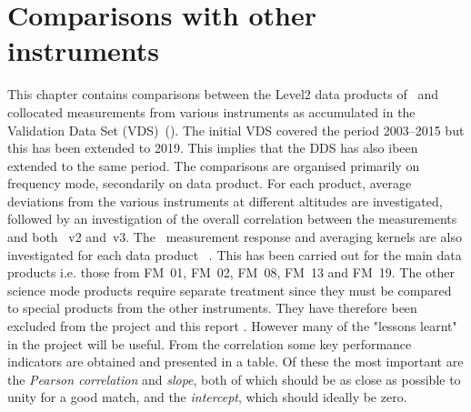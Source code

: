 \chapter{Comparisons with other instruments}
\label{chapter:comparisons}
This chapter contains comparisons between the Level2 data products of \smr\ and
collocated measurements from various instruments as accumulated in the
Validation Data Set (VDS)~(\cite{VDS:2016}).  The initial VDS covered the period
2003--2015 but this has been extended to 2019.  This implies that the DDS has also ibeen extended  to the same period.
The comparisons are organised primarily on frequency mode, secondarily on data
product. For each product, average deviations from the various instruments at
different altitudes are investigated, followed by an investigation of the
overall correlation between the measurements and both \smr~v2 and~v3. The \smr\
measurement response and averaging kernels are also investigated for each data
product~\cite{atbdl2} .  This has been carried out for the main data products
i.e. those from FM~01, FM~02, FM~08, FM~13 and FM~19.  The other science mode
products require separate treatment since they must be compared to special
products from the other instruments. They have therefore been excluded from the project and this report .
However many of the "lessons learnt" in the project will be useful.
From the correlation some key performance indicators are obtained and presented
in a table. Of these the most important are the \emph{Pearson correlation} and
\emph{slope}, both of which should be as close as possible to unity for a good
match, and the \emph{intercept}, which should ideally be zero.
